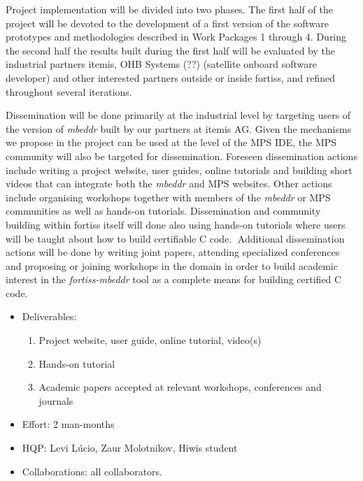 Project implementation will be divided into two phases. The first
half of the project will be devoted to the development of a first version of
the software prototypes and methodologies described in Work Packages 1 through 4. During the second
half the results built during the first half will be evaluated by
the industrial partners itemis, OHB Systems (??) (satellite onboard software
developer) and other interested partners outside or inside fortiss, and refined
throughout several iterations.

Dissemination will be done primarily at the industrial level by targeting users
of the version of \emph{mbeddr} built by our partners at itemis AG. Given the
mechanisms we propose in the project can be used at the level of the MPS IDE,
the MPS community will also be targeted for dissemination. Foreseen
dissemination actions include writing a project website, user guides, online
tutorials and building short videos that can integrate both the \emph{mbeddr} and MPS
websites. Other actions include organising workshops together with members of
the \emph{mbeddr} or MPS communities as well as hands-on tutorials.
Dissemination and community building within fortiss itself will done also using
hands-on tutorials where users will be taught about how to build certifiable C
code.􏰁 Additional dissemination actions will be done by writing joint papers,
attending specialized conferences and proposing or joining workshops in the
domain in order to build academic interest in the \emph{fortiss-mbeddr} tool as
a complete means for building certified C code.

\begin{itemize}
  \item Deliverables:
  \begin{enumerate}
    \item Project website, user guide, online tutorial, video(s)
	\item Hands-on tutorial
	\item Academic papers accepted at relevant workshops, conferences and journals
  \end{enumerate}
  \item Effort: 2 man-months
  \item HQP: Levi L\'ucio, Zaur Molotnikov, Hiwis student
  \item Collaborations: all collaborators.
\end{itemize}